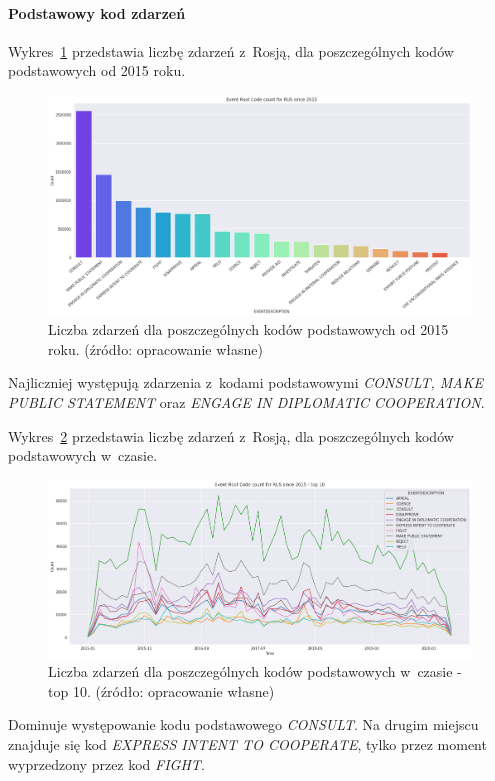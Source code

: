 \documentclass[11pt]{report}
\begin{document}
    \paragraph{Podstawowy kod zdarzeń}

    Wykres~\ref{fig:RUSPERC} przedstawia liczbę zdarzeń z~Rosją, dla poszczególnych kodów podstawowych od 2015 roku.

    \begin{figure}[!htp]
        \centering
        \includegraphics[width=\linewidth]{fig/RUS/RUSERC.png}
        \caption{Liczba zdarzeń dla poszczególnych kodów podstawowych od 2015 roku. (źródło: opracowanie własne)}
        \label{fig:RUSPERC}
    \end{figure}
    Najliczniej występują zdarzenia z~kodami podstawowymi \textit{CONSULT, MAKE PUBLIC STATEMENT} oraz \textit{ENGAGE IN DIPLOMATIC COOPERATION}.

    Wykres~\ref{fig:RUSPERCinTIME} przedstawia liczbę zdarzeń z~Rosją, dla poszczególnych kodów podstawowych w~czasie.
    \begin{figure}[!htp]
        \centering
        \includegraphics[width=\linewidth]{fig/RUS/RUSERCinTIME.png}
        \caption{Liczba zdarzeń dla poszczególnych kodów podstawowych w~czasie - top 10. (źródło: opracowanie własne)}
        \label{fig:RUSPERCinTIME}
    \end{figure}
    Dominuje występowanie kodu podstawowego \textit{CONSULT}.
    Na drugim miejscu znajduje się kod \textit{EXPRESS INTENT TO COOPERATE}, tylko przez moment wyprzedzony przez kod \textit{FIGHT}.
\end{document}
